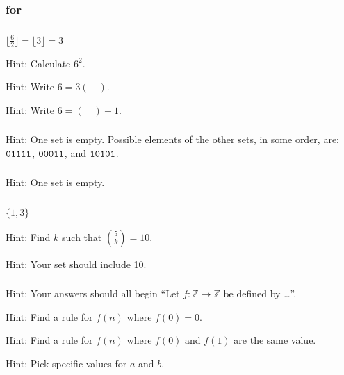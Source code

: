 \subsubsection{\answers for 
\subsetbuild}

\subsubsection*{ \answers}
\begin{apart}
    \item $\lfloor\frac{6}{2}\rfloor=\lfloor3\rfloor=3$
    \item Hint: Calculate $6^2$.
    \item Hint: Write $6=3(\quad)$.
    \item Hint: Write $6 = (\quad) + 1$.
\end{apart}

\subsubsection*{ \answers}
Hint:  One set is empty.  Possible elements of the other sets, in some order, are: $\texttt{01111}$, $\texttt{00011}$, and $\texttt{10101}$.

\subsubsection*{ \answers}
Hint: One set is empty.  

\subsubsection*{ \answers}
\begin{apart}
    \item $\{1,3\}$
    \item Hint: Find $k$ such that $\binom{5}{k} = 10$.
    \item Hint: Your set should include 10.
\end{apart}

\subsubsection*{ \answers}
Hint: Your answers should all begin ``Let $f: \mathbb{Z} \to \mathbb{Z}$ be defined by \ldots''.
\begin{apart}
    \item Hint: Find a rule for $f(n)$ where $f(0)=0$.
    \item Hint: Find a rule for $f(n)$ where $f(0)$ and $f(1)$ are the same value.
    \item Hint: Pick specific values for $a$ and $b$.
\end{apart}

